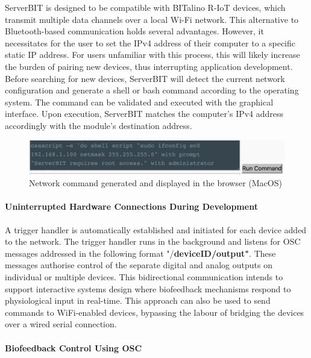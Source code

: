 ServerBIT is designed to be compatible with BITalino R-IoT devices, which transmit multiple data channels over a local Wi-Fi network. This alternative to Bluetooth-based communication holds several advantages. However, it necessitates for the user to set the IPv4 address of their computer to a specific static IP address. For users unfamiliar with this process, this will likely increase the burden of pairing new devices, thus interrupting application development. Before searching for new devices, ServerBIT will detect the current network configuration and generate a shell or bash command according to the operating system. The command can be validated and executed with the graphical interface. Upon execution, ServerBIT matches the computer's IPv4 address accordingly with the module's destination address.

\begin{figure}[ht]
    \centering
    \includegraphics[width=\textwidth]{Chapters/Figures/technical/ServerBIT/ipv4_cmd_osx.png}
    \caption{Network command generated and displayed in the browser (MacOS)}
    \label{fig:cmd_osx}
\end{figure}

\paragraph{Uninterrupted Hardware Connections During Development}

A trigger handler is automatically established and initiated for each device added to the network. The trigger handler runs in the background and listens for OSC messages addressed in the following format "/\textbf{deviceID/output"}. These messages authorise control of the separate digital and analog outputs on individual or multiple devices. This bidirectional communication intends to support interactive systems design where biofeedback mechanisms respond to physiological input in real-time. This approach can also be used to send commands to WiFi-enabled devices, bypassing the labour of bridging the devices over a wired serial connection.

\paragraph{Biofeedback Control Using OSC} \label{Biofeedback}

